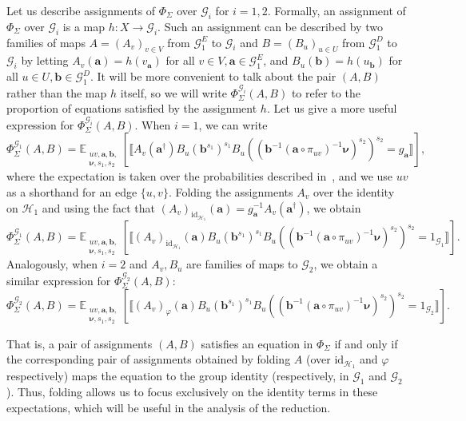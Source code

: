 \documentclass[a4paper,11pt]{article}
\theoremstyle{definition}
\newcommand{\tuple}[1]{{\mathbf{#1}}}
\newcommand{\ex}[1]{\mathbb{E}_{#1}}
\newcommand{\gr}{\mathscr{G}}
\newcommand{\sgr}{\mathscr{H}}
\newcommand{\groupid}{1}
\begin{document}
Let us describe assignments of $\Phi_\Sigma$ over $\gr_i$ for $i=1,2$. Formally, an assignment of $\Phi_\Sigma$ over $\gr_i$ is a map $h: X\rightarrow \gr_i$. Such an assignment can be described by two families of maps $A=(A_v)_{v\in V}$ from $\gr^E_1$ to $\gr_i$ and $B=(B_u)_{u\in U}$ from $\gr_1^D$ to $\gr_i$ by letting
$A_v(\tuple{a})= h(v_{\tuple{a}}) $ for all $v\in V, \tuple{a}\in \gr_1^E$, and $B_u(\tuple{b})=h(u_{\tuple{b}})$ for all $u\in U, \tuple{b}\in \gr_1^D$. It will be more convenient to talk about the pair $(A,B)$ rather than the map $h$ itself, so we will write $\Phi^{\gr_i}_\Sigma(
A,B)$ to refer to the proportion of equations satisfied by the assignment $h$. 
Let us give a more useful expression for $\Phi^{\gr_i}_\Sigma(
A,B)$. When $i=1$, we can write
\[
\Phi^{\gr_1}_\Sigma(
A,B) = 
\ex{\substack{uv,\tuple{a},\tuple{b}, \\ \bm{\nu},s_1,s_2}} \left[ 
\llbracket A_v(\tuple{a}^\dagger) B_u(\tuple{b}^{s_1})^{s_1} B_u((\tuple{b}^{-1} (\tuple{a} \circ \pi_{uv})^{-1}\bm{\nu})^{s_2})^{s_2}    = g_{\tuple{a}} \rrbracket 
\right],
\]
where the expectation is taken over the probabilities described in~, and we use $uv$ as a shorthand for an edge $\{u,v\}$. 
Folding the assignments $A_v$ over the identity on $\sgr_1$ and using the fact that $(A_v)_{\mathrm{id}_{\sgr_1}}(\tuple{a})=g_{\tuple{a}}^{-1}A_v(\tuple{a}^\dagger)$, we obtain
\begin{equation}
\label{eq:payoff_gr1}
\Phi^{\gr_1}_\Sigma(
A,B) = 
\ex{\substack{uv,\tuple{a},\tuple{b}, \\ \bm{\nu},s_1,s_2}} \left[ 
\llbracket (A_v)_{\mathrm{id}_{\sgr_1}}(\tuple{a}) B_u(\tuple{b}^{s_1})^{s_1} B_u((\tuple{b}^{-1} (\tuple{a} \circ \pi_{uv})^{-1}\bm{\nu})^{s_2})^{s_2}    = \groupid_{\gr_1} \rrbracket 
\right]. 
\end{equation}
Analogously, when $i=2$
and $A_v, B_u$ are families of maps to $\gr_2$, we obtain a similar expression for $\Phi^{\gr_2}_\Sigma(A,B)$:
\begin{equation}
\label{eq:payoff_gr2}
\Phi^{\gr_2}_\Sigma(
A,B) = 
\ex{\substack{uv,\tuple{a},\tuple{b}, \\ \bm{\nu},s_1,s_2}} \left[ 
\llbracket (A_v)_{\varphi}(\tuple{a}) B_u(\tuple{b}^{s_1})^{s_1} B_u((\tuple{b}^{-1} (\tuple{a} \circ \pi_{uv})^{-1}\bm{\nu})^{s_2})^{s_2}    = \groupid_{\gr_2} \rrbracket 
\right]. 
\end{equation}

That is, a pair of assignments $(A,B)$ satisfies an equation in $\Phi_\Sigma$ if and only if the corresponding pair of assignments obtained by folding $A$ (over $\mathrm{id}_{\sgr_1}$ and $\varphi$ respectively) maps the equation to the group identity (respectively, in $\gr_1$ and $\gr_2$). Thus, folding allows us to focus exclusively on the identity terms in these expectations, which will be useful in the analysis of the reduction.
\end{document}
